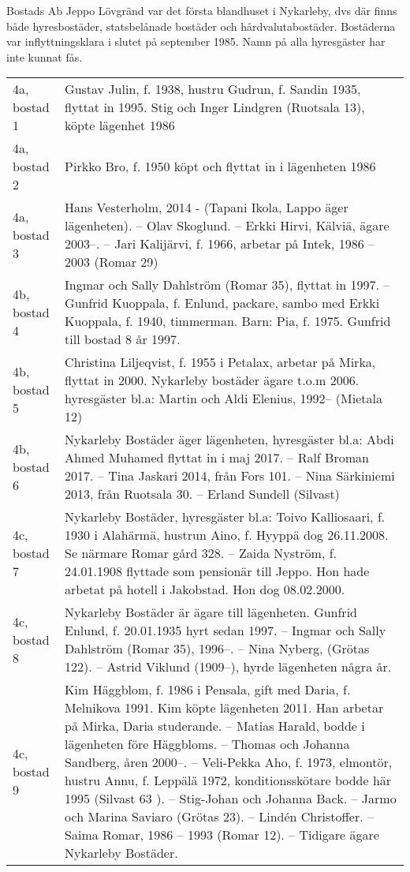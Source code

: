Bostads Ab Jeppo Lövgränd var det första blandhuset i Nykarleby, dvs där finns både hyresbostäder, statsbelånade bostäder och hårdvalutabostäder. Bostäderna var inflyttningsklara i slutet på september 1985. Namn på alla hyresgäster har inte kunnat fås.
\begin{center}
  \begin{tabular}{l p{}}
    \hline
    4a, bostad 1 & Gustav Julin, f. 1938, hustru Gudrun, f. Sandin 1935, flyttat in 1995. Stig och Inger Lindgren (Ruotsala 13), köpte lägenhet 1986 \\
    4a, bostad 2 & Pirkko Bro, f. 1950 köpt och flyttat in i lägenheten 1986 \\
    4a, bostad 3 & Hans Vesterholm,  2014  - (Tapani Ikola, Lappo äger lägenheten). -- Olav Skoglund. --	Erkki Hirvi, Kälviä, ägare 2003--\allowbreak 2007. --	Jari Kalijärvi, f. 1966, arbetar på Intek, 1986 – 2003 (Romar 29) \\
    4b, bostad 4 & Ingmar och Sally Dahlström (Romar 35), flyttat in 1997. -- Gunfrid Kuoppala, f. Enlund, packare, sambo med Erkki Kuoppala, f. 1940, timmerman. Barn: Pia, f. 1975. Gunfrid till bostad 8 år 1997. \\
    4b, bostad 5 & Christina Liljeqvist, f. 1955 i Petalax, arbetar på Mirka, flyttat in 2000. Nykarleby bostäder ägare t.o.m 2006. hyresgäster bl.a: Martin och Aldi Elenius, 1992--\allowbreak 1999 (Mietala 12) \\
    4b, bostad 6 & Nykarleby Bostäder äger lägenheten, hyresgäster bl.a: Abdi Ahmed Muhamed flyttat in i maj 2017. -- Ralf Broman 2017. -- Tina Jaskari 2014, från Fors 101. -- Nina Särkiniemi 2013, från Ruotsala 30. -- Erland Sundell (Silvast) \\
    4c, bostad 7 & Nykarleby Bostäder, hyresgäster bl.a: Toivo Kalliosaari, f. 1930 i Alahärmä, hustrun Aino, f. Hyyppä dog 26.11.2008. Se närmare Romar gård 328. -- Zaida Nyström, f. 24.01.1908 flyttade som pensionär till Jeppo. Hon hade arbetat på hotell i Jakobstad. Hon dog 08.02.2000. \\
    4c, bostad 8 & Nykarleby Bostäder är ägare till lägenheten. Gunfrid Enlund, f. 20.01.1935 hyrt sedan 1997. -- Ingmar och Sally Dahlström (Romar 35), 1996--\allowbreak 1997. -- Nina Nyberg, (Grötas 122).	-- Astrid Viklund (1909--\allowbreak 1992), hyrde lägenheten några år. \\
    4c, bostad 9 & Kim Häggblom, f. 1986 i Pensala, gift med Daria, f. Melnikova 1991. Kim köpte lägenheten  2011. Han arbetar på Mirka, Daria studerande. -- Matias Harald, bodde i lägenheten före Häggbloms. -- Thomas och Johanna Sandberg, åren 2000--\allowbreak 2003.	-- Veli-Pekka Aho, f. 1973, elmontör, hustru Annu, f. Leppälä 1972, konditionsskötare bodde här 1995  (Silvast 63 ). -- Stig-Johan och Johanna Back. -- Jarmo och Marina Saviaro (Grötas 23). -- Lindén Christoffer. -- Saima Romar,  1986 – 1993 (Romar 12). -- Tidigare ägare  Nykarleby Bostäder. \\
    \hline
  \end{tabular}
\end{center}



